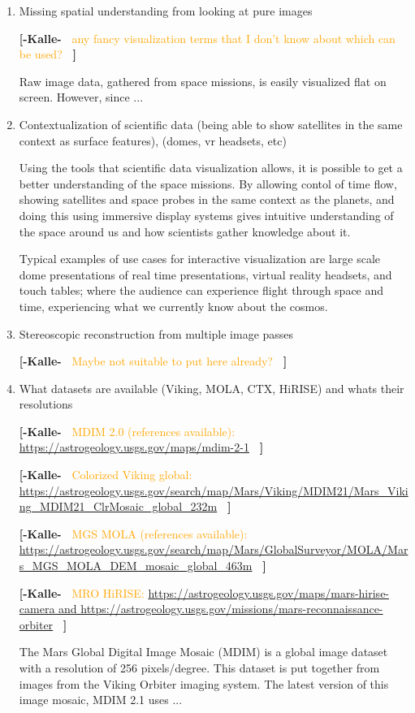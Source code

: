 \documentclass[journal]{vgtc}                %
\newcommand{\kallecomment}[1]{\textbf{[-Kalle-~}
    \textcolor{orange}{#1}
    \textbf{~]}}
\begin{document}
\begin{enumerate}
\item Missing spatial understanding from looking at pure images

\kallecomment{any fancy visualization terms that I don't know about which can be used?}

Raw image data, gathered from space missions, is easily visualized flat on screen. However, since ... 

\item Contextualization of scientific data (being able to show satellites in the same context as surface features), (domes, vr headsets, etc)

Using the tools that scientific data visualization allows, it is possible to get a better understanding of the space missions.
By allowing contol of time flow, showing satellites and space probes in the same context as the planets, and doing this using immersive display systems gives intuitive understanding of the space around us and how scientists gather knowledge about it.

Typical examples of use cases for interactive visualization are large scale dome presentations of real time presentations, virtual reality headsets, and touch tables; where the audience can experience flight through space and time, experiencing what we currently know about the cosmos.

\item Stereoscopic reconstruction from multiple image passes

\kallecomment{Maybe not suitable to put here already?}

\item What datasets are available (Viking, MOLA, CTX, HiRISE) and whats their resolutions

\kallecomment{MDIM 2.0 (references available): \url{https://astrogeology.usgs.gov/maps/mdim-2-1}}

\kallecomment{Colorized Viking global: \url{https://astrogeology.usgs.gov/search/map/Mars/Viking/MDIM21/Mars_Viking_MDIM21_ClrMosaic_global_232m}}

\kallecomment{MGS MOLA (references available): \url{https://astrogeology.usgs.gov/search/map/Mars/GlobalSurveyor/MOLA/Mars_MGS_MOLA_DEM_mosaic_global_463m}}

\kallecomment{MRO HiRISE: \url{https://astrogeology.usgs.gov/maps/mars-hirise-camera and https://astrogeology.usgs.gov/missions/mars-reconnaissance-orbiter}}

The Mars Global Digital Image Mosaic (MDIM) is a global image dataset with a resolution of 256 pixels/degree.
This dataset is put together from images from the Viking Orbiter imaging system. The latest version of this image mosaic, MDIM 2.1 uses ...


\end{enumerate}
\end{document}
